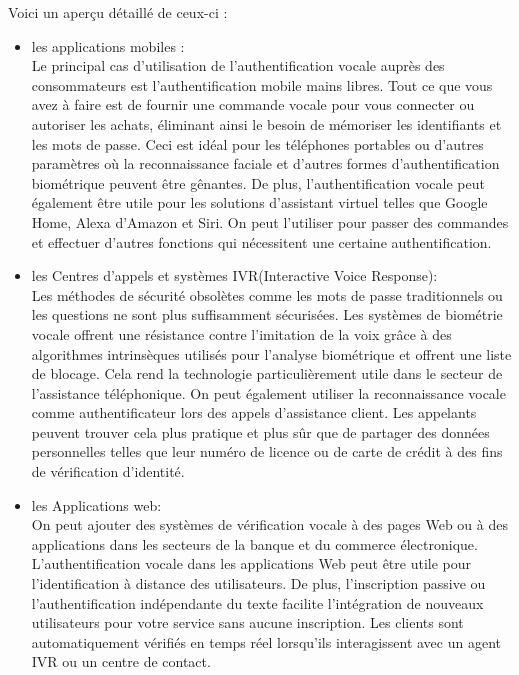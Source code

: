 Voici un aperçu détaillé de ceux-ci :
\begin{itemize}
    \item les applications mobiles :\\Le principal cas d'utilisation de l'authentification vocale auprès des consommateurs est l'authentification mobile mains libres. Tout ce que vous avez à faire est de fournir une commande vocale pour vous connecter ou autoriser les achats, éliminant ainsi le besoin de mémoriser les identifiants et les mots de passe.
    Ceci est idéal pour les téléphones portables ou d'autres paramètres où la reconnaissance faciale et d'autres formes d'authentification biométrique peuvent être gênantes.
    De plus, l'authentification vocale peut également être utile pour les solutions d'assistant virtuel telles que Google Home, Alexa d'Amazon et Siri. On peut l'utiliser pour passer des commandes et effectuer d'autres fonctions qui nécessitent une certaine authentification.
    
    \item les Centres d'appels et systèmes IVR(Interactive Voice Response):\\Les méthodes de sécurité obsolètes comme les mots de passe traditionnels ou les questions ne sont plus suffisamment sécurisées.
    Les systèmes de biométrie vocale offrent une résistance contre l'imitation de la voix grâce à des algorithmes intrinsèques utilisés pour l'analyse biométrique et offrent une liste de blocage. Cela rend la technologie particulièrement utile dans le secteur de l'assistance téléphonique.
    On peut également utiliser la reconnaissance vocale comme authentificateur lors des appels d'assistance client. Les appelants peuvent trouver cela plus pratique et plus sûr que de partager des données personnelles telles que leur numéro de licence ou de carte de crédit à des fins de vérification d'identité.
    
    \item les Applications web:\\On peut ajouter des systèmes de vérification vocale à des pages Web ou à des applications dans les secteurs de la banque et du commerce électronique. L'authentification vocale dans les applications Web peut être utile pour l'identification à distance des utilisateurs.
    De plus, l'inscription passive ou l'authentification indépendante du texte facilite l'intégration de nouveaux utilisateurs pour votre service sans aucune inscription. Les clients sont automatiquement vérifiés en temps réel lorsqu'ils interagissent avec un agent IVR ou un centre de contact.
    

\end{itemize}
